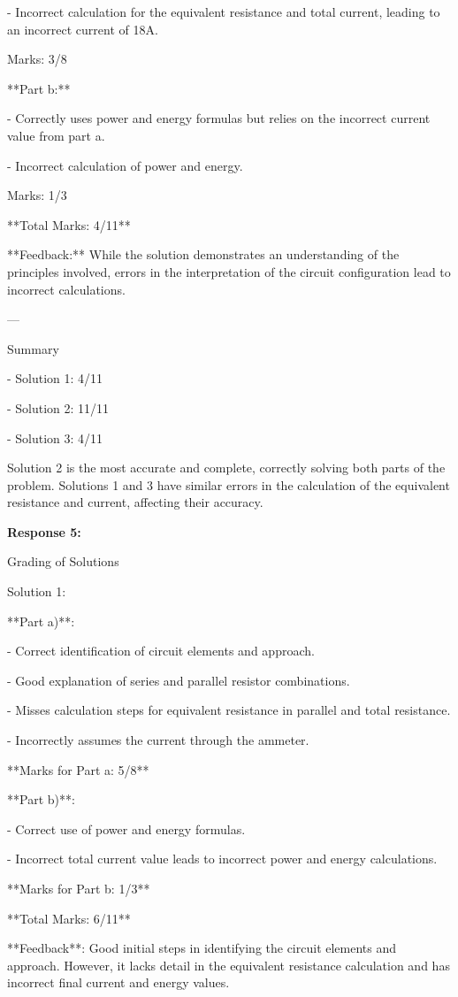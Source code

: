 \documentclass[a4paper,11pt]{article}
\begin{document}
- Incorrect calculation for the equivalent resistance and total current, leading to an incorrect current of 18A.

Marks: 3/8

**Part b:**

- Correctly uses power and energy formulas but relies on the incorrect current value from part a.

- Incorrect calculation of power and energy.

Marks: 1/3

**Total Marks: 4/11**

**Feedback:**
While the solution demonstrates an understanding of the principles involved, errors in the interpretation of the circuit configuration lead to incorrect calculations.

---

Summary

- Solution 1: 4/11

- Solution 2: 11/11

- Solution 3: 4/11

Solution 2 is the most accurate and complete, correctly solving both parts of the problem. Solutions 1 and 3 have similar errors in the calculation of the equivalent resistance and current, affecting their accuracy.

\bigskip 
\textbf{Response 5:}

Grading of Solutions

Solution 1:

**Part a)**:

- Correct identification of circuit elements and approach.

- Good explanation of series and parallel resistor combinations.

- Misses calculation steps for equivalent resistance in parallel and total resistance.

- Incorrectly assumes the current through the ammeter.

**Marks for Part a: 5/8**

**Part b)**:

- Correct use of power and energy formulas.

- Incorrect total current value leads to incorrect power and energy calculations.

**Marks for Part b: 1/3**

**Total Marks: 6/11**

**Feedback**: Good initial steps in identifying the circuit elements and approach. However, it lacks detail in the equivalent resistance calculation and has incorrect final current and energy values.
\end{document}
